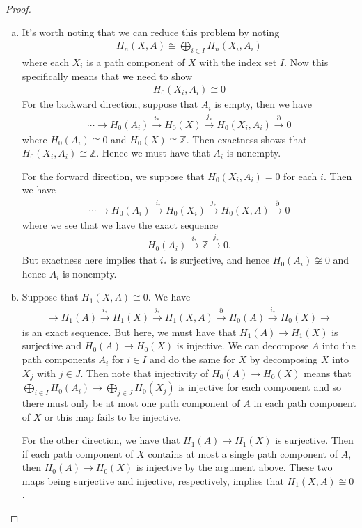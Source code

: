 \documentclass[leqno]{article}
\theoremstyle{nonumberplain}
\newtheorem{proof}{Proof}
\newcommand{\Z}{\mathbb{Z}}
\begin{document}
\begin{proof}~
\begin{enumerate}[(a)]
\item It's worth noting that we can reduce this problem by noting
\begin{align*}
H_n(X,A)\cong \bigoplus_{i\in I} H_n(X_i,A_i)
\end{align*}
where each $X_i$ is a path component of $X$ with the index set $I$.  Now this specifically means that we need to show 
\begin{align*}
H_0(X_i,A_i)\cong 0
\end{align*}
For the backward direction, suppose that $A_i$ is empty, then we have
\begin{align*}
\cdots \rightarrow H_0(A_i)\xrightarrow{i_*} H_0(X) \xrightarrow{j_*} H_0(X_i,A_i) \xrightarrow{\partial} 0
\end{align*}
where $H_0(A_i)\cong 0$ and $H_0(X)\cong \Z$.  Then exactness shows that $H_0(X_i,A_i)\cong \Z$.  Hence we must have that $A_i$ is nonempty.

For the forward direction, we suppose that $H_0(X_i,A_i)=0$ for each $i$. Then we have
\begin{align*}
\cdots \rightarrow H_0(A_i)\xrightarrow{i_*} H_0(X_i) \xrightarrow{j_*} H_0(X,A) \xrightarrow{\partial} 0
\end{align*}
where we see that we have the exact sequence
\begin{align*}
H_0(A_i)\xrightarrow{i_*} \Z \xrightarrow{j_*} 0.
\end{align*}
But exactness here implies that $i_*$ is surjective, and hence $H_0(A_i)\not\cong 0$ and hence $A_i$ is nonempty.  

\item Suppose that $H_1(X,A)\cong 0$. We have 
\begin{align*}
\rightarrow H_1(A) \xrightarrow{i_*} H_1(X) \xrightarrow{j_*} H_1(X,A) \xrightarrow{\partial} H_0(A) \xrightarrow{i_*} H_0(X) \rightarrow
\end{align*}
is an exact sequence.  But here, we must have that $H_1(A)\to H_1(X)$ is surjective and $H_0(A)\to H_0(X)$ is injective.  We can decompose $A$ into the path components $A_i$ for $i\in I$ and do the same for $X$ by decomposing $X$ into $X_j$ with $j\in J$. Then note that injectivity of $H_0(A)\to H_0(X)$ means that $\bigoplus_{i\in I}H_0(A_i)\to \bigoplus_{j\in J}H_0(X_j)$ is injective for each component and so there must only be at most one path component of $A$ in each path component of $X$ or this map fails to be injective.

For the other direction, we have that $H_1(A)\to H_1(X)$ is surjective.  Then if each path component of $X$ contains at most a single path component of $A$, then $H_0(A)\to H_0(X)$ is injective by the argument above.  These two maps being surjective and injective, respectively, implies that $H_1(X,A)\cong 0$.
\end{enumerate}
\end{proof}
\end{document}
